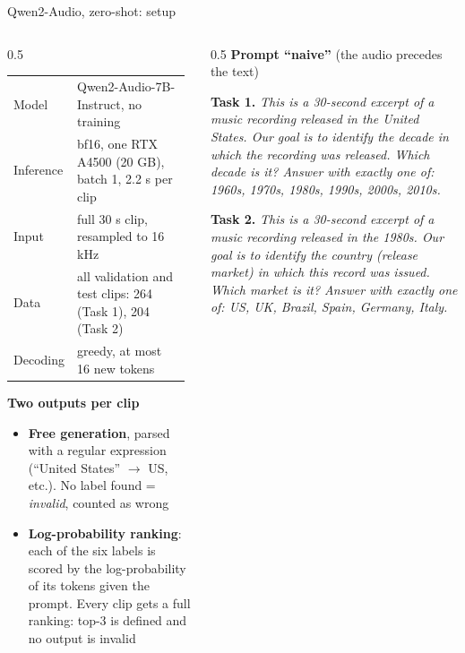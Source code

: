 \documentclass[aspectratio=169,11pt]{beamer}
\newenvironment{tight}{\begin{itemize}\setlength{\itemsep}{1.5pt}\setlength{\parskip}{0pt}\setlength{\topsep}{0pt}}{\end{itemize}}
\begin{document}
\begin{frame}[t]{Qwen2-Audio, zero-shot: setup}
  \begin{columns}[T]
    \begin{column}{0.5\textwidth}
      {\scriptsize\setlength{\tabcolsep}{3pt}
      \begin{tabular}{@{}>{\raggedright\arraybackslash}p{0.22\linewidth}>{\raggedright\arraybackslash}p{0.74\linewidth}@{}}
        \toprule
        Model & Qwen2-Audio-7B-Instruct, no training \\
        Inference & bf16, one RTX A4500 (20 GB), batch 1, 2.2 s per clip \\
        Input & full 30 s clip, resampled to 16 kHz \\
        Data & all validation and test clips: 264 (Task 1), 204 (Task 2) \\
        Decoding & greedy, at most 16 new tokens \\
        \bottomrule
      \end{tabular}}
      \vspace{0.4em}

      {\footnotesize\textbf{Two outputs per clip}}
      \begin{tight}\footnotesize
        \item \textbf{Free generation}, parsed with a regular expression (``United States'' $\rightarrow$ US, etc.). No label found = \emph{invalid}, counted as wrong
        \item \textbf{Log-probability ranking}: each of the six labels is scored by the log-probability of its tokens given the prompt. Every clip gets a full ranking: top-3 is defined and \alert{no output is invalid}
      \end{tight}
    \end{column}
    \begin{column}{0.5\textwidth}
      {\footnotesize\textbf{Prompt ``naive''} (the audio precedes the text)}

      \vspace{0.3em}
      {\scriptsize \textbf{Task 1.} \emph{This is a 30-second excerpt of a music recording released in the United States. Our goal is to identify the decade in which the recording was released.
      Which decade is it? Answer with exactly one of: 1960s, 1970s, 1980s, 1990s, 2000s, 2010s.}\par}

      \vspace{0.6em}
      {\scriptsize \textbf{Task 2.} \emph{This is a 30-second excerpt of a music recording released in the 1980s. Our goal is to identify the country (release market) in which this record was issued.
      Which market is it? Answer with exactly one of: US, UK, Brazil, Spain, Germany, Italy.}\par}
    \end{column}
  \end{columns}
\end{frame}
\end{document}

